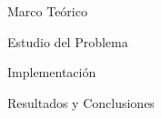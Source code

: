 \documentclass[a4paper,12pt]{report}
\begin{document}
\newpage
\listoffigures{}

\newpage
\listoftables{}


\newpage
\newpage
\begin{part}{Marco Teórico}
\newpage
\newpage
\newpage
\end{part}
\begin{part}{Estudio del Problema}\label{part:partestudio}
\newpage
\newpage
\newpage
\newpage

\end{part}
\begin{part}{Implementación}\label{part:partimple}
\newpage
\newpage
\end{part}
\begin{part}{Resultados y Conclusiones}
\newpage

\newpage

\newpage
\end{part}
\end{document}
